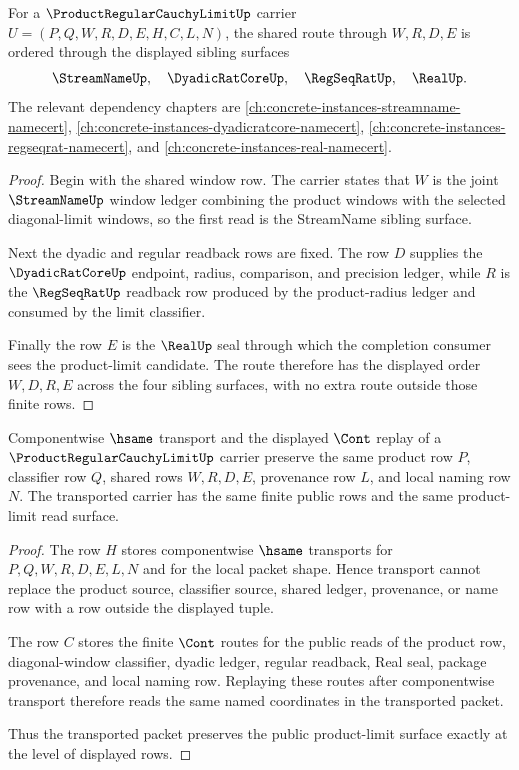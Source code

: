 \begin{theorem}
\label{thm:product-regular-cauchy-limit-shared-window-exactness}
For a $\ProductRegularCauchyLimitUp$ carrier $U=(P,Q,W,R,D,E,H,C,L,N)$, the shared route through $W,R,D,E$ is ordered through the displayed sibling surfaces
$$
\StreamNameUp,\quad \DyadicRatCoreUp,\quad \RegSeqRatUp,\quad \RealUp .
$$
The relevant dependency chapters are \autoref{ch:concrete-instances-streamname-namecert}, \autoref{ch:concrete-instances-dyadicratcore-namecert}, \autoref{ch:concrete-instances-regseqrat-namecert}, and \autoref{ch:concrete-instances-real-namecert}.
\end{theorem}
\begin{proof}
Begin with the shared window row. The carrier states that $W$ is the joint $\StreamNameUp$ window ledger combining the product windows with the selected diagonal-limit windows, so the first read is the StreamName sibling surface.

Next the dyadic and regular readback rows are fixed. The row $D$ supplies the $\DyadicRatCoreUp$ endpoint, radius, comparison, and precision ledger, while $R$ is the $\RegSeqRatUp$ readback row produced by the product-radius ledger and consumed by the limit classifier.

Finally the row $E$ is the $\RealUp$ seal through which the completion consumer sees the product-limit candidate. The route therefore has the displayed order $W,D,R,E$ across the four sibling surfaces, with no extra route outside those finite rows.
\end{proof}

\begin{theorem}
\label{thm:product-regular-cauchy-limit-transport-stability}
Componentwise $\hsame$ transport and the displayed $\Cont$ replay of a $\ProductRegularCauchyLimitUp$ carrier preserve the same product row $P$, classifier row $Q$, shared rows $W,R,D,E$, provenance row $L$, and local naming row $N$. The transported carrier has the same finite public rows and the same product-limit read surface.
\end{theorem}
\begin{proof}
The row $H$ stores componentwise $\hsame$ transports for $P,Q,W,R,D,E,L,N$ and for the local packet shape. Hence transport cannot replace the product source, classifier source, shared ledger, provenance, or name row with a row outside the displayed tuple.

The row $C$ stores the finite $\Cont$ routes for the public reads of the product row, diagonal-window classifier, dyadic ledger, regular readback, Real seal, package provenance, and local naming row. Replaying these routes after componentwise transport therefore reads the same named coordinates in the transported packet.

Thus the transported packet preserves the public product-limit surface exactly at the level of displayed rows.
\end{proof}

